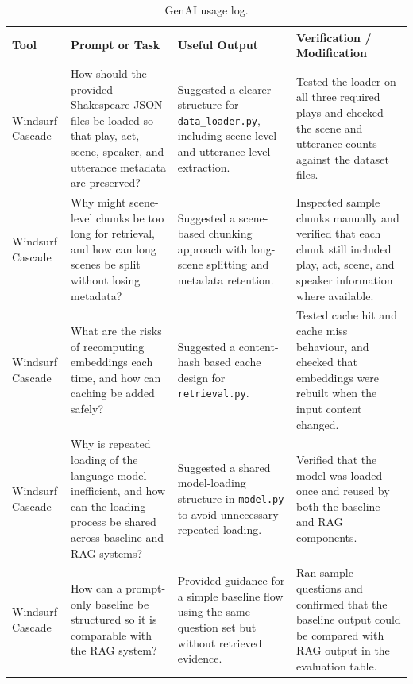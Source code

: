 \documentclass[10pt,conference]{IEEEtran}
\begin{document}
\begin{table}[!t]
\centering
\caption{GenAI usage log.}
\label{tab:genai-log}
\small
\begin{tabularx}{\textwidth}{p{2.2cm} p{3.4cm} p{3.4cm} X}
\toprule
Tool & Prompt or Task & Useful Output & Verification / Modification \\
\midrule

Windsurf Cascade 
& How should the provided Shakespeare JSON files be loaded so that play, act, scene, speaker, and utterance metadata are preserved? 
& Suggested a clearer structure for \texttt{data\_loader.py}, including scene-level and utterance-level extraction. 
& Tested the loader on all three required plays and checked the scene and utterance counts against the dataset files. \\

\midrule

Windsurf Cascade 
& Why might scene-level chunks be too long for retrieval, and how can long scenes be split without losing metadata? 
& Suggested a scene-based chunking approach with long-scene splitting and metadata retention. 
& Inspected sample chunks manually and verified that each chunk still included play, act, scene, and speaker information where available. \\

\midrule

Windsurf Cascade 
& What are the risks of recomputing embeddings each time, and how can caching be added safely? 
& Suggested a content-hash based cache design for \texttt{retrieval.py}. 
& Tested cache hit and cache miss behaviour, and checked that embeddings were rebuilt when the input content changed. \\

\midrule

Windsurf Cascade 
& Why is repeated loading of the language model inefficient, and how can the loading process be shared across baseline and RAG systems? 
& Suggested a shared model-loading structure in \texttt{model.py} to avoid unnecessary repeated loading. 
& Verified that the model was loaded once and reused by both the baseline and RAG components. \\

\midrule

Windsurf Cascade 
& How can a prompt-only baseline be structured so it is comparable with the RAG system? 
& Provided guidance for a simple baseline flow using the same question set but without retrieved evidence. 
& Ran sample questions and confirmed that the baseline output could be compared with RAG output in the evaluation table. \\


\end{tabularx}
\end{table}
\end{document}
